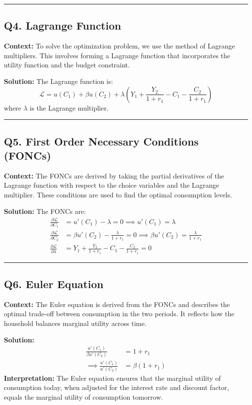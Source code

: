 \documentclass{article}
\begin{document}
\noindent\rule{\linewidth}{0.5pt}


\subsection*{Q4. Lagrange Function}

\textbf{Context:} To solve the optimization problem, we use the method of Lagrange multipliers. This involves forming a Lagrange function that incorporates the utility function and the budget constraint.

\textbf{Solution:} The Lagrange function is:
\[
\mathcal{L} = u(C_1) + \beta u(C_2) + \lambda \left(Y_1 + \frac{Y_2}{1 + r_1} - C_1 - \frac{C_2}{1 + r_1}\right)
\]
where \( \lambda \) is the Lagrange multiplier.

\noindent\rule{\linewidth}{0.5pt}


\subsection*{Q5. First Order Necessary Conditions (FONCs)}

\textbf{Context:} The FONCs are derived by taking the partial derivatives of the Lagrange function with respect to the choice variables and the Lagrange multiplier. These conditions are used to find the optimal consumption levels.

\textbf{Solution:} The FONCs are:
\begin{align*}
    \frac{\partial \mathcal{L}}{\partial C_1} &= u'(C_1) - \lambda = 0 \implies u'(C_1) = \lambda \\
    \frac{\partial \mathcal{L}}{\partial C_2} &= \beta u'(C_2) - \frac{\lambda}{1 + r_1} = 0 \implies \beta u'(C_2) = \frac{\lambda}{1 + r_1} \\
    \frac{\partial \mathcal{L}}{\partial \lambda} &= Y_1 + \frac{Y_2}{1 + r_1} - C_1 - \frac{C_2}{1 + r_1} = 0
\end{align*}

\noindent\rule{\linewidth}{0.5pt}

\subsection*{Q6. Euler Equation}

\textbf{Context:} The Euler equation is derived from the FONCs and describes the optimal trade-off between consumption in the two periods. It reflects how the household balances marginal utility across time.

\textbf{Solution:}
\begin{align*}
    \frac{u'(C_1)}{\beta u'(C_2)} &= 1 + r_1 \\
    \implies \frac{u'(C_1)}{u'(C_2)} &= \beta (1 + r_1)
\end{align*}
\textbf{Interpretation:} The Euler equation ensures that the marginal utility of consumption today, when adjusted for the interest rate and discount factor, equals the marginal utility of consumption tomorrow.
\end{document}
